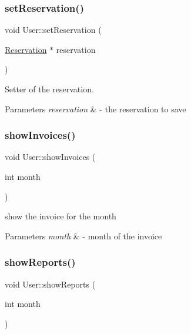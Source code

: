 \subsubsection{\texorpdfstring{set\+Reservation()}{setReservation()}}
{\footnotesize\ttfamily void User\+::set\+Reservation (\begin{DoxyParamCaption}\item[{\mbox{\hyperlink{class_reservation}{Reservation}} $\ast$}]{reservation }\end{DoxyParamCaption})}



Setter of the reservation. 


\begin{DoxyParams}{Parameters}
{\em reservation} & -\/ the reservation to save \\
\hline
\end{DoxyParams}
\mbox{\label{class_user_a134a83476c6c006c77e552f22c810ed9}} 
\subsubsection{\texorpdfstring{show\+Invoices()}{showInvoices()}}
{\footnotesize\ttfamily void User\+::show\+Invoices (\begin{DoxyParamCaption}\item[{int}]{month }\end{DoxyParamCaption})}



show the invoice for the month 


\begin{DoxyParams}{Parameters}
{\em month} & -\/ month of the invoice \\
\hline
\end{DoxyParams}
\mbox{\label{class_user_a0fec4842d197ad4cb255f5362f38ef6e}} 
\subsubsection{\texorpdfstring{show\+Reports()}{showReports()}}
{\footnotesize\ttfamily void User\+::show\+Reports (\begin{DoxyParamCaption}\item[{int}]{month }\end{DoxyParamCaption})}



